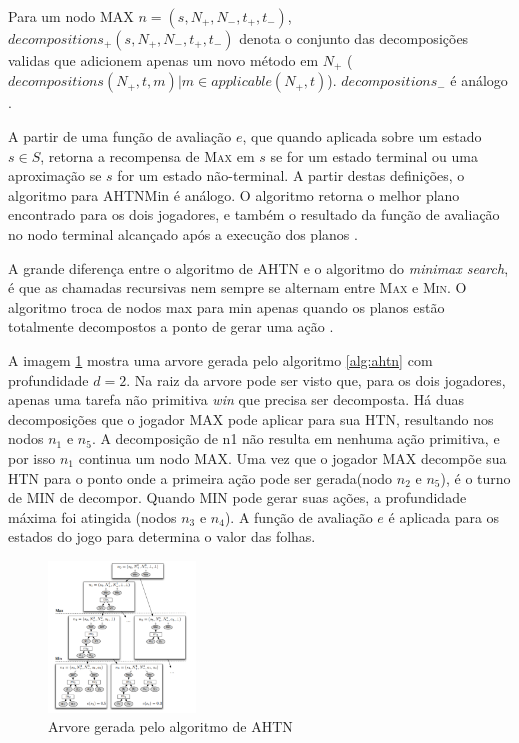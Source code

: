 Para um nodo MAX $n = (s, N_{+}, N_{-}, t_{+}, t_{-})$, $decompositions_{+}(s, N_{+}, N_{-}, t_{+}, t_{-})$ denota o conjunto das decomposições validas que adicionem apenas um novo método em $N_{+}$ (${decompositions(N_{+}, t, m) | m \in applicable(N_{+}, t)}$).  $decompositions_{-}$ é análogo \cite{ontanon2015adversarial}.

A partir de uma função de avaliação $e$, que quando aplicada sobre um estado $s \in S$, retorna a recompensa de \textsc{Max} em $s$ se for um estado terminal ou uma aproximação se $s$ for um estado não-terminal. 
A partir destas definições, o algoritmo para AHTNMin é análogo. 
O algoritmo retorna o melhor plano encontrado para os dois jogadores, e também o resultado da função de avaliação no nodo terminal alcançado após a execução dos planos \cite{ontanon2015adversarial}. 

A grande diferença entre o algoritmo de AHTN e o algoritmo do \textit{minimax search}, é que as chamadas recursivas nem sempre se alternam entre \textsc{Max} e \textsc{Min}. 
O algoritmo troca de nodos max para min apenas quando os planos estão totalmente decompostos a ponto de gerar uma ação \cite{ontanon2015adversarial}.

A imagem \ref{fig:ahtn} mostra uma arvore gerada pelo algoritmo \ref{alg:ahtn} com profundidade $d = 2$. 
Na raiz da arvore pode ser visto que, para os dois jogadores, apenas uma tarefa não primitiva \textit{win} que precisa ser decomposta. 
Há duas decomposições que o jogador MAX pode aplicar para sua HTN, resultando nos nodos $n_{1}$ e $n_{5}$. 
A decomposição de n1 não resulta em nenhuma ação primitiva, e por isso $n_{1}$ continua um nodo MAX. 
Uma vez que o jogador MAX decompõe sua HTN para o ponto onde a primeira ação pode ser gerada(nodo $n_{2}$ e $n_{5}$), é o turno de MIN de decompor. Quando MIN pode gerar suas ações, a profundidade máxima foi atingida (nodos $n_{3}$ e $n_{4}$). 
A função de avaliação $e$ é aplicada para os estados do jogo para determina o valor das folhas.

\begin{figure}[ht]
	\centering
	\includegraphics[width=0.35\textwidth]{fig/ahtn.pdf}
	\caption{Arvore gerada pelo algoritmo de AHTN}
	\label{fig:ahtn}
\end{figure} 